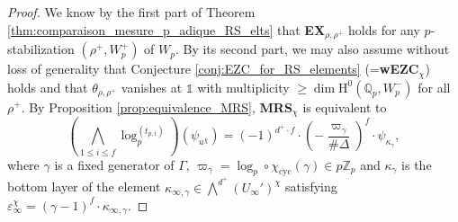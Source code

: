 \documentclass[12pt]{amsart}
\newcommand\Zp{{\mathbb{Z}_p}}
\newcommand\Qp{{\mathbb{Q}_p}}
\DeclareMathOperator{\cyc}{cyc}
\newcommand{\HH}{\mathrm{H}}
\theoremstyle{defstyle}
\theoremstyle{thmstyle}
\begin{document}
\begin{proof}
	We know by the first part of Theorem \ref{thm:comparaison_mesure_p_adique_RS_elts} that \textbf{EX}$_{\rho,\rho^+}$ holds for any $p$-stabilization $(\rho^+,W_p^+)$ of $W_p$. By its second part, we may also assume without loss of generality that Conjecture \ref{conj:EZC_for_RS_elements} (=\textbf{wEZC}$_\chi$) holds and that $\theta_{\rho,\rho^+}$ vanishes at $\mathds{1}$ with multiplicity $\geq \dim \HH^0(\Qp,W_p^-)$ for all $\rho^+$. By Proposition \ref{prop:equivalence_MRS}, \textbf{MRS}$_\chi$ is equivalent to 
	\begin{equation}\label{eq:MRS_equivalence}
	\left(\bigwedge_{1\leq i \leq f} \log_p^{(t_{p,i})}\right)(\psi_{u^\chi}) = (-1)^{d^+\cdot f}\cdot \left(-\frac{\varpi_\gamma}{\#\Delta}\right)^f \cdot \psi_{\kappa_\gamma},
	\end{equation}
	 where $\gamma$ is a fixed generator of $\Gamma$, $\varpi_\gamma=\log_p\circ\chi_{\cyc}(\gamma)\in p\Zp$ and $\kappa_\gamma$ is the bottom layer of the element $\kappa_{\infty,\gamma}\in{\bigwedge}^{d^+}(U_\infty')^\chi$ satisfying $\varepsilon_\infty^\chi=(\gamma-1)^f\cdot\kappa_{\infty,\gamma}$. 
	

\end{proof}
\end{document}
